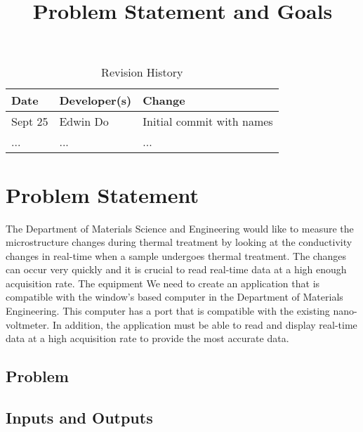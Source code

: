 \documentclass{article}
\title{Problem Statement and Goals\\\progname}
\author{\authname}
\date{}
\begin{document}
\maketitle

\begin{table}[hp]
\caption{Revision History} \label{TblRevisionHistory}
\begin{tabularx}{\textwidth}{llX}
\toprule
\textbf{Date} & \textbf{Developer(s)} & \textbf{Change}\\
\midrule
Sept 25 & Edwin Do & Initial commit with names\\
... & ... & ...\\
\bottomrule
\end{tabularx}
\end{table}

\section{Problem Statement}
The Department of Materials Science and Engineering would like to measure the microstructure changes
during thermal treatment by looking at the conductivity changes in real-time when a sample undergoes 
thermal treatment. The changes can occur very quickly and it is crucial to read real-time data at a high enough acquisition rate.
The equipment 
We need to create an application that is compatible with the window's based computer in the Department of Materials Engineering.
This computer has a
port that is compatible with the existing nano-voltmeter. 
In addition, the application must be able to read and display real-time data at a high acquisition rate to provide the most accurate data.



\subsection{Problem}

\subsection{Inputs and Outputs}

\end{document}
